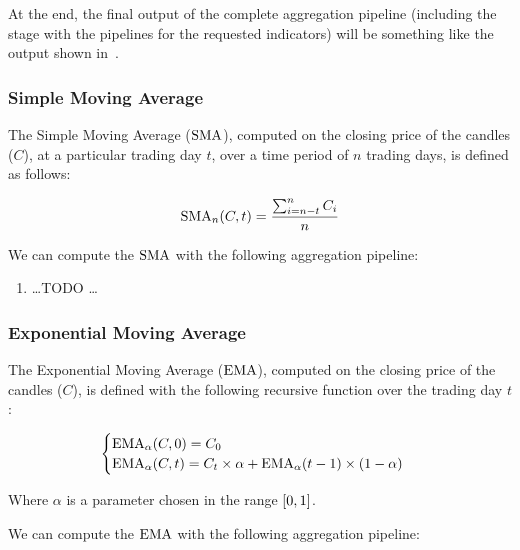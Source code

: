 At the end, the final output of the complete aggregation pipeline (including the
 stage with the pipelines for the requested indicators) will be
something like the output shown in~.



\subsubsection{Simple Moving Average}

The Simple Moving Average (\(\operatorname{SMA}\)), computed on the closing price of the
candles (\(C\)), at a particular trading day \(t\), over a time period of \(n\)
trading days, is defined as follows:

\begin{equation}\label{eq:sma}
	\operatorname{SMA}_n(C,t) = \frac{\sum_{i = n - t}^n C_i}{n}
\end{equation}

We can compute the \(\operatorname{SMA}\) with the following aggregation pipeline:

\begin{enumerate}
	\item \ldots TODO \ldots
\end{enumerate}

\subsubsection{Exponential Moving Average}

The Exponential Moving Average (\(\operatorname{EMA}\)), computed on the closing price of the
candles (\(C\)), is defined with the following recursive function over the
trading day \(t\):

\begin{equation}\label{eq:ema}
	\begin{cases}
		\operatorname{EMA}_{\alpha}(C,0) = C_0\\
		\operatorname{EMA}_{\alpha}(C,t) = C_t\times\alpha +
		\operatorname{EMA}_{\alpha}(t-1)\times(1-\alpha)
	\end{cases}
\end{equation}

Where \(\alpha\) is a parameter chosen in the range \(\interval{0}{1}\).

We can compute the \(\operatorname{EMA}\) with the following aggregation pipeline:

